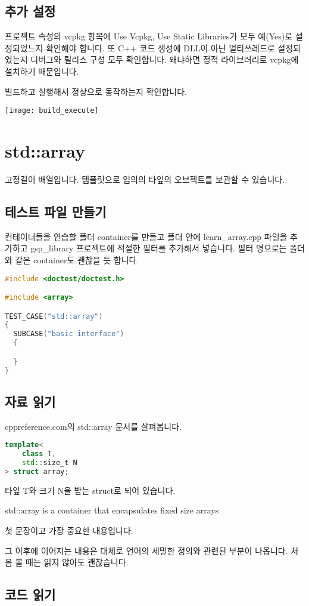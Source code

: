 \subsection{추가 설정}

프로젝트 속성의 vcpkg 항목에 Use Vcpkg, Use Static Libraries가 모두 예(Yes)로 설정되었느지 
확인해야 합니다. 또 C++ \textrightarrow 코드 생성에 DLL이 아닌 멀티쓰레드로 설정되었는지 
디버그와 릴리스 구성 모두 확인합니다. 왜냐하면 정적 라이브러리로 vcpkg에 설치하기 
때문입니다. 

빌드하고 실행해서 정상으로 동작하는지 확인합니다. 

\texttt{[image: build\_execute]}

\section{std::array}

고정길이 배열입니다. 템플릿으로 임의의 타잎의 오브젝트를 보관할 수 있습니다. 

\subsection{테스트 파일 만들기}

컨테이너들을 연습할 폴더 container를 만들고 폴더 안에 learn\_array.cpp 파일을 
추가하고 gsp\_library 프로젝트에 적절한 필터를 추가해서 넣습니다. 필터 명으로는 
폴더와 같은 container도 괜찮을 듯 합니다. 

\begin{lstlisting}[language=c++, caption={시작 골격}]
#include <doctest/doctest.h>

#include <array>

TEST_CASE("std::array")
{
  SUBCASE("basic interface")
  {

  }
}
\end{lstlisting}

\subsection{자료 읽기}

cppreference.com의 std::array 문서를 살펴봅니다. 

\begin{lstlisting}[language=c++, caption={타잎}]
  template<
    class T,
    std::size_t N
> struct array;
\end{lstlisting}

타잎 T와 크기 N을 받는 struct로 되어 있습니다. 

\begin{tcolorbox}
  std::array is a container that encapsulates fixed size arrays
\end{tcolorbox}

첫 문장이고 가장 중요한 내용입니다. 

그 이후에 이어지는 내용은 대체로 언어의 세밀한 정의와 관련된 부분이 나옵니다. 
처음 볼 때는 읽지 않아도 괜찮습니다. 




\subsection{코드 읽기}


